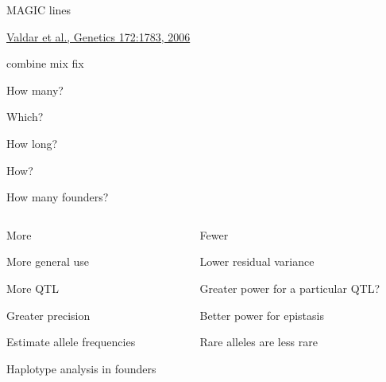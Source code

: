 \documentclass[12pt,t,aspectratio=169]{beamer}
\begin{document}
\begin{frame}{MAGIC lines}

 \vspace{5mm}


  \vspace{20mm}

\hfill {\footnotesize \href{http://www.genetics.org/content/172/3/1783.full}{\lolit Valdar et al., Genetics 172:1783, 2006}}

  \small {\hilit

  \vspace*{-24mm}
\hspace*{30mm} combine \hspace*{18mm} mix \hspace*{29mm} fix}

\vspace*{10pt}
\hspace*{8mm}
How many?

\vspace*{8pt}
\hspace*{8mm}
Which?


\vspace*{-35pt}
\hspace*{60mm}
How long?

\vspace*{-12pt}
\hspace*{100mm}
How?

\end{frame}




\begin{frame}{How many founders?}

\vspace{8mm}

  \begin{columns}

    \begin{column}{0.5\textwidth}
      {\hilit More}

{\small
\bi
\item More general use
\item More QTL
\item Greater precision
\item Estimate allele frequencies
\item Haplotype analysis in founders
  \ei
}

    \end{column}

    \begin{column}{0.5\textwidth}
      {\hilit Fewer}

{\small
\bi
\item Lower residual variance
\item Greater power for a particular QTL?
\item Better power for epistasis
\item Rare alleles are less rare
\ei
}
    \end{column}


  \end{columns}


\end{frame}
\end{document}
